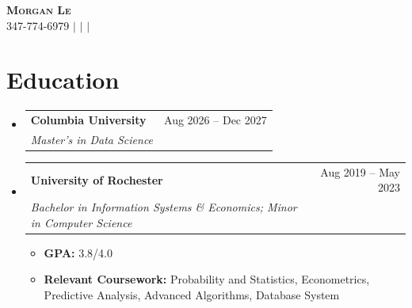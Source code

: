 \documentclass[a4paper,11pt]{article}
\makeatletter
\newcommand{\resumeItem}[1]{
  \item\small{
    {#1\par\vspace{-2pt}}
  }
}
\newcommand{\resumeSubheading}[4]{
  \vspace{-2pt}\item
    \begin{tabular*}{0.97\textwidth}[t]{l@{\extracolsep{\fill}}r}
      \textbf{#1} & #2 \\
      \textit{\small#3} & \textit{\small #4} \\
    \end{tabular*}\vspace{-7pt}
}
\newcommand{\resumeSubHeadingListStart}{\begin{itemize}[leftmargin=0.15in, label={}]}
\newcommand{\resumeSubHeadingListEnd}{\end{itemize}}
\newcommand{\resumeItemListStart}{\begin{itemize}}
\newcommand{\resumeItemListEnd}{\end{itemize}\vspace{-5pt}}
\makeatother
\begin{document}
\begin{center}
    \textbf{\Huge \scshape Morgan Le} \\ \vspace{1pt}
    \small 347-774-6979 $|$
    \href{mailto:ml5536@columbia.edu}{\underline{}} $|$
    \href{https://www.linkedin.com/in/morganhle/}{\underline{}} $|$
    \href{https://lhnminh.github.io/}{\underline{}}
\end{center}

\section{Education}
\resumeSubHeadingListStart
  \resumeSubheading
    {Columbia University}{Aug 2026 -- Dec 2027}
    {Master's in Data Science}{}
  \resumeSubheading
    {University of Rochester}{Aug 2019 -- May 2023}
    {Bachelor in Information Systems \& Economics; Minor in Computer Science}{}
    \resumeItemListStart
      \resumeItem{\textbf{GPA:} 3.8/4.0}
      \resumeItem{\textbf{Relevant Coursework:} Probability and Statistics, Econometrics, Predictive Analysis, Advanced Algorithms, Database System}
    \resumeItemListEnd
\resumeSubHeadingListEnd
\end{document}
